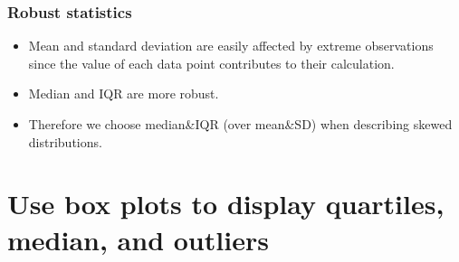 \documentclass[11pt]{beamer}
\begin{document}
\begin{frame}
\frametitle{Robust statistics}

\begin{itemize}

\item Mean and standard deviation are easily affected by extreme observations since the value of each data point contributes to their calculation.

\item Median and IQR are more robust.

\item Therefore we choose median\&IQR (over mean\&SD) when describing skewed distributions.

\end{itemize}


\end{frame}


\section{Use box plots to display quartiles, median, and outliers}
\label{mi10}

\end{document}
